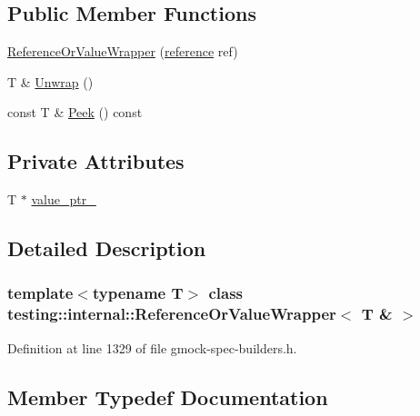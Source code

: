 \subsection*{Public Member Functions}
\begin{DoxyCompactItemize}
\item 
\hyperlink{classtesting_1_1internal_1_1ReferenceOrValueWrapper_3_01T_01_6_01_4_ad31b242ceae7f318096c78a798b33379}{Reference\+Or\+Value\+Wrapper} (\hyperlink{classtesting_1_1internal_1_1ReferenceOrValueWrapper_3_01T_01_6_01_4_a62e7f6ebcf40daa08130ea52fd0215ee}{reference} ref)
\item 
T \& \hyperlink{classtesting_1_1internal_1_1ReferenceOrValueWrapper_3_01T_01_6_01_4_a0b95dd4e20f237aee89864507172706e}{Unwrap} ()
\item 
const T \& \hyperlink{classtesting_1_1internal_1_1ReferenceOrValueWrapper_3_01T_01_6_01_4_a2a4ad5debafad859d2ad51ba8473c92a}{Peek} () const
\end{DoxyCompactItemize}
\subsection*{Private Attributes}
\begin{DoxyCompactItemize}
\item 
T $\ast$ \hyperlink{classtesting_1_1internal_1_1ReferenceOrValueWrapper_3_01T_01_6_01_4_a16e7ba51d763d4992837a62c770c91f1}{value\+\_\+ptr\+\_\+}
\end{DoxyCompactItemize}


\subsection{Detailed Description}
\subsubsection*{template$<$typename T$>$\newline
class testing\+::internal\+::\+Reference\+Or\+Value\+Wrapper$<$ T \& $>$}



Definition at line 1329 of file gmock-\/spec-\/builders.\+h.



\subsection{Member Typedef Documentation}
\mbox{\label{classtesting_1_1internal_1_1ReferenceOrValueWrapper_3_01T_01_6_01_4_a62e7f6ebcf40daa08130ea52fd0215ee}} 

